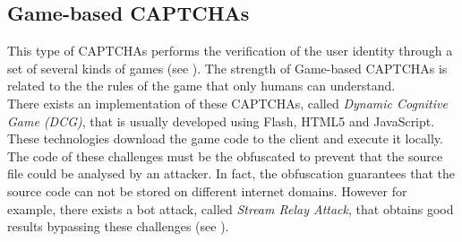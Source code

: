 \subsection{Game-based CAPTCHAs}
This type of CAPTCHAs performs the verification of the user identity through a set of several kinds of games (see ). The strength of Game-based CAPTCHAs is related to the the rules of the game that only humans can understand.\\
There exists an implementation of these CAPTCHAs, called \textit{Dynamic Cognitive Game (DCG)}, that is usually developed using Flash, HTML5 and JavaScript. These technologies download the game code to the client and execute it locally.\\
The code of these challenges must be the obfuscated to prevent that the source file could be analysed by an attacker. In fact, the obfuscation guarantees that the source code can not be stored on different internet domains. However for example, there exists a bot attack, called \textit{Stream Relay Attack}, that obtains good results bypassing these challenges \cite{game_CAPTCHA} (see ).
